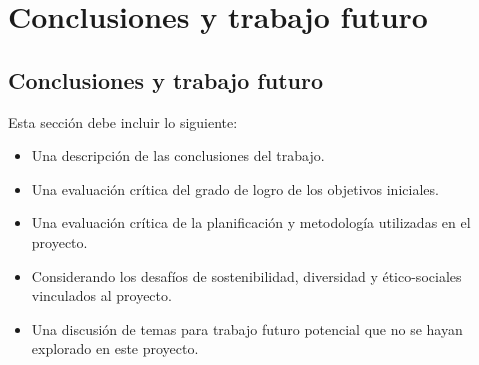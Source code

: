 \chapter{Conclusiones y trabajo futuro}
\label{chapter:Conclusiones y trabajo futuro}



\section{Conclusiones y trabajo futuro}

Esta sección debe incluir lo siguiente:

\begin{itemize}
    \item Una descripción de las conclusiones del trabajo.
    \item Una evaluación crítica del grado de logro de los objetivos iniciales.
    \item Una evaluación crítica de la planificación y metodología utilizadas en el proyecto.
    \item Considerando los desafíos de sostenibilidad, diversidad y ético-sociales vinculados al proyecto.
    \item Una discusión de temas para trabajo futuro potencial que no se hayan explorado en este proyecto.
\end{itemize}